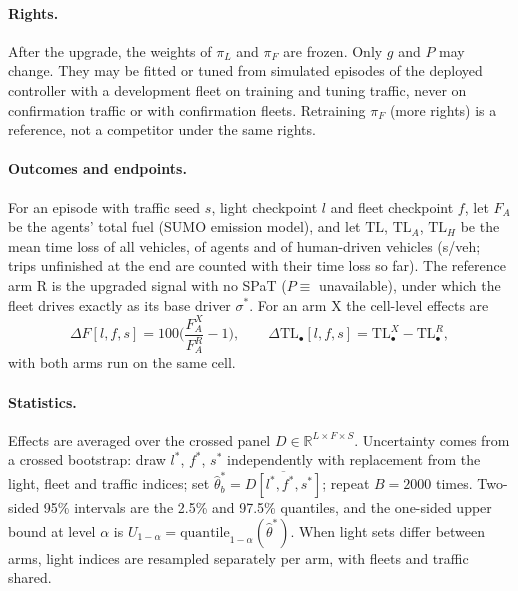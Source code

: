 \documentclass[11pt]{article}
\begin{document}
\paragraph{Rights.} After the upgrade, the weights of $\pi_L$ and $\pi_F$ are frozen. Only $g$ and $P$ may change. They may be fitted or
tuned from simulated episodes of the deployed controller with a development fleet on training and tuning traffic, never on confirmation
traffic or with confirmation fleets. Retraining $\pi_F$ (more rights) is a reference, not a competitor under the same rights.
\paragraph{Outcomes and endpoints.} For an episode with traffic seed $s$, light checkpoint $l$ and fleet checkpoint $f$, let $F_A$ be the
agents' total fuel (SUMO emission model), and let $\mathrm{TL}$, $\mathrm{TL}_A$, $\mathrm{TL}_H$ be the mean time loss of all vehicles,
of agents and of human-driven vehicles (s/veh; trips unfinished at the end are counted with their time loss so far). The reference arm R
is the upgraded signal with no SPaT ($P\equiv$ unavailable), under which the fleet drives exactly as its base driver $\sigma^*$. For an arm
X the cell-level effects are
\begin{equation}
\Delta F[l,f,s] = 100\Big(\frac{F_A^{X}}{F_A^{R}}-1\Big), \qquad \Delta\mathrm{TL}_\bullet[l,f,s]=\mathrm{TL}_\bullet^{X}-\mathrm{TL}_\bullet^{R},
\end{equation}
with both arms run on the same cell.
\paragraph{Statistics.} Effects are averaged over the crossed panel $D\in\mathbb R^{L\times F\times S}$. Uncertainty comes from a crossed
bootstrap: draw $l^*$, $f^*$, $s^*$ independently with replacement from the light, fleet and traffic indices; set
$\hat\theta^*_b=\overline{D[l^*,f^*,s^*]}$; repeat $B=2000$ times. Two-sided 95\% intervals are the 2.5\% and 97.5\% quantiles, and the
one-sided upper bound at level $\alpha$ is $U_{1-\alpha}=\mathrm{quantile}_{1-\alpha}(\hat\theta^*)$. When light sets differ between
arms, light indices are resampled separately per arm, with fleets and traffic shared.
\end{document}
